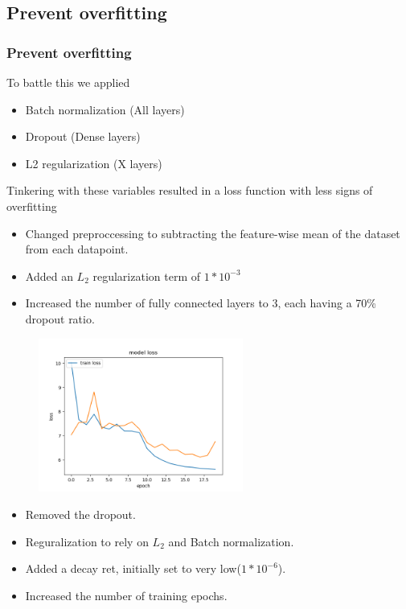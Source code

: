 \documentclass{beamer}
\begin{document}
\subsection{Prevent overfitting}
\begin{frame}
  \frametitle{Prevent overfitting}
  To battle this we applied
  \begin{itemize}
    \item Batch normalization (All layers)
    \item Dropout (Dense layers)
    \item L2 regularization (X layers)
  \end{itemize}
  Tinkering with these variables resulted in a loss function with less signs of overfitting
\end{frame}

\begin{frame}
  \begin{itemize}
    \item  Changed preproccessing to subtracting the feature-wise mean of the dataset from each datapoint.
    \item Added an $L_{2}$ regularization term of $1*10^{-3}$
    \item Increased the number of fully connected layers to 3, each having a 70\% dropout ratio.
  \end{itemize}

  \begin{figure}[!h]
  \centering
  \includegraphics[width=0.6\textwidth]{images/improved_loss_1.png}
  \end{figure}
\end{frame}


\begin{frame}
  \begin{itemize}
    \item Removed the dropout.
    \item Reguralization to rely on $L_{2}$ and Batch normalization.
    \item Added a decay ret, initially set to very low($1*10^{-6}$).
    \item Increased the number of training epochs.
  \end{itemize}
\end{frame}
\end{document}
